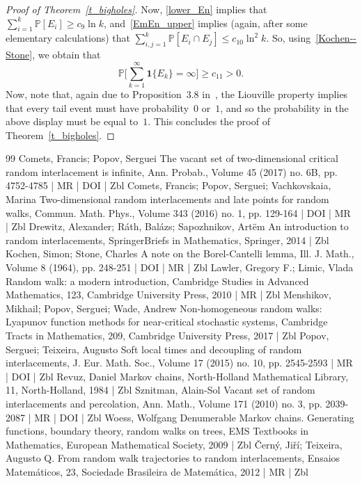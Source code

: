\documentclass[10pt]{amsart}
\theoremstyle{definition}\newtheorem{defi}[theo]{Definition}\newtheorem{rema}[theo]{Remark}\newtheorem{exam}[theo]{Example}\newtheorem{exem}[theo]{Example}\newtheorem{nota}[theo]{Notation}
\newcommand{\1}[1]{{\mathbf 1}{\{#1\}}}
\newcommand{\8}{{\infty}}
\newcommand{\IP}{{\mathbb P}}
\begin{document}
\begin{proof}[Proof of Theorem~\ref{t_bigholes}]
Now, \eqref{lower_En} implies that $\sum_{i=1}^k\IP[E_i]\geq c_{9}\ln k$, and~\eqref{EmEn_upper} implies (again, after some elementary calculations) that $\sum_{i,j=1}^k\IP[E_i\cap E_j]\leq c_{10}\ln^2 k$. So, using~\eqref{Kochen--Stone}, we obtain that
\[
\IP\Big[\sum_{k=1}^\infty \1{E_k}=\infty\Big] \geq c_{11}>0.
\]
Now, note that, again due to Proposition~3.8 in~\cite[Chapter~2]{R84}, the Liouville property implies that every tail event must have probability~$0$ or~$1$, and so the probability in the above display must be equal to~$1$. This concludes the proof of Theorem~\ref{t_bigholes}.
\end{proof}


\begin{thebibliography}{99}
Comets, Francis; Popov, Serguei The vacant set of two-dimensional critical random interlacement is infinite, Ann. Probab., Volume 45 (2017) no. 6B, pp. 4752-4785 | MR | DOI | Zbl
Comets, Francis; Popov, Serguei; Vachkovskaia, Marina Two-dimensional random interlacements and late points for random walks, Commun. Math. Phys., Volume 343 (2016) no. 1, pp. 129-164 | DOI | MR | Zbl
Drewitz, Alexander; Ráth, Balázs; Sapozhnikov, Artëm An introduction to random interlacements, SpringerBriefs in Mathematics, Springer, 2014 | Zbl
Kochen, Simon; Stone, Charles A note on the Borel-Cantelli lemma, Ill. J. Math., Volume 8 (1964), pp. 248-251 | DOI | MR | Zbl
Lawler, Gregory F.; Limic, Vlada Random walk: a modern introduction, Cambridge Studies in Advanced Mathematics, 123, Cambridge University Press, 2010 | MR | Zbl
Menshikov, Mikhail; Popov, Serguei; Wade, Andrew Non-homogeneous random walks: Lyapunov function methods for near-critical stochastic systems, Cambridge Tracts in Mathematics, 209, Cambridge University Press, 2017 | Zbl
Popov, Serguei; Teixeira, Augusto Soft local times and decoupling of random interlacements, J. Eur. Math. Soc., Volume 17 (2015) no. 10, pp. 2545-2593 | MR | DOI | Zbl
Revuz, Daniel Markov chains, North-Holland Mathematical Library, 11, North-Holland, 1984 | Zbl
Sznitman, Alain-Sol Vacant set of random interlacements and percolation, Ann. Math., Volume 171 (2010) no. 3, pp. 2039-2087 | MR | DOI | Zbl
Woess, Wolfgang Denumerable Markov chains. Generating functions, boundary theory, random walks on trees, EMS Textbooks in Mathematics, European Mathematical Society, 2009 | Zbl
Černý, Jiří; Teixeira, Augusto Q. From random walk trajectories to random interlacements, Ensaios Matemáticos, 23, Sociedade Brasileira de Matemática, 2012 | MR | Zbl
\end{thebibliography}
\end{document}
